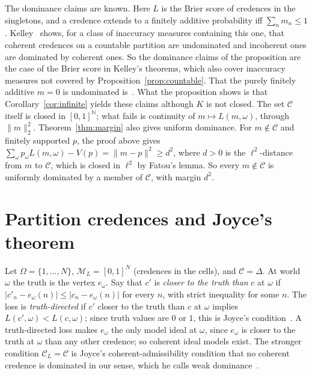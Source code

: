 \documentclass[11pt]{article}
\theoremstyle{definition}
\theoremstyle{remark}
\newcommand{\M}{\mathcal M}
\newcommand{\C}{\mathcal C}
\begin{document}
The dominance claims are known. Here $L$ is the Brier score of credences in the singletons, and a credence extends to a finitely additive probability iff $\sum_nm_n\le1$. Kelley~\cite[Theorems 3.4 and 4.26]{Kelley} shows, for a class of inaccuracy measures containing this one, that coherent credences on a countable partition are undominated and incoherent ones are dominated by coherent ones. So the dominance claims of the proposition are the case of the Brier score in Kelley's theorems, which also cover inaccuracy measures not covered by Proposition~\ref{prop:countable}. That the purely finitely additive $m=0$ is undominated is~\cite[Example~3]{SSK14}. What the proposition shows is that Corollary~\ref{cor:infinite} yields these claims although $K$ is not closed. The set $\C$ itself is closed in $[0,1]^{\mathbb N}$; what fails is continuity of $m\mapsto L(m,\omega)$, through $\|m\|_2^2$. Theorem~\ref{thm:margin} also gives uniform dominance. For $m\notin\C$ and finitely supported $p$, the proof above gives $\sum_\omega p_\omega L(m,\omega)-V(p)=\|m-p\|^2\ge d^2$, where $d>0$ is the $\ell^2$-distance from $m$ to $\C$, which is closed in $\ell^2$ by Fatou's lemma. So every $m\notin\C$ is uniformly dominated by a member of $\C$, with margin $d^2$.

\section{Partition credences and Joyce's theorem}\label{sec:joyce}
Let $\Omega=\{1,\dots,N\}$, $\M_L=[0,1]^N$ (credences in the cells), and $\C=\Delta$. At world $\omega$ the truth is the vertex $e_\omega$. Say that $c'$ is \emph{closer to the truth than} $c$ at $\omega$ if $|c'_n-e_\omega(n)|\le|c_n-e_\omega(n)|$ for every $n$, with strict inequality for some $n$. The loss is \emph{truth-directed} if $c'$ closer to the truth than $c$ at $\omega$ implies $L(c',\omega)<L(c,\omega)$; since truth values are $0$ or $1$, this is Joyce's condition~\cite[p.~269]{Joyce}. A truth-directed loss makes $e_\omega$ the only model ideal at $\omega$, since $e_\omega$ is closer to the truth at $\omega$ than any other credence; so coherent ideal models exist. The stronger condition $\C_L=\C$ is Joyce's coherent-admissibility condition that no coherent credence is dominated in our sense, which he calls weak dominance~\cite[pp.~267, 280]{Joyce}.
\end{document}
